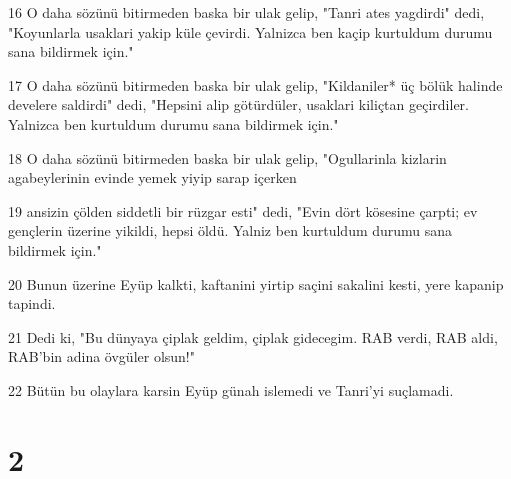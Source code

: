 \par 16 O daha sözünü bitirmeden baska bir ulak gelip, "Tanri ates yagdirdi" dedi, "Koyunlarla usaklari yakip küle çevirdi. Yalnizca ben kaçip kurtuldum durumu sana bildirmek için."
\par 17 O daha sözünü bitirmeden baska bir ulak gelip, "Kildaniler* üç bölük halinde develere saldirdi" dedi, "Hepsini alip götürdüler, usaklari kiliçtan geçirdiler. Yalnizca ben kurtuldum durumu sana bildirmek için."
\par 18 O daha sözünü bitirmeden baska bir ulak gelip, "Ogullarinla kizlarin agabeylerinin evinde yemek yiyip sarap içerken
\par 19 ansizin çölden siddetli bir rüzgar esti" dedi, "Evin dört kösesine çarpti; ev gençlerin üzerine yikildi, hepsi öldü. Yalniz ben kurtuldum durumu sana bildirmek için."
\par 20 Bunun üzerine Eyüp kalkti, kaftanini yirtip saçini sakalini kesti, yere kapanip tapindi.
\par 21 Dedi ki, "Bu dünyaya çiplak geldim, çiplak gidecegim. RAB verdi, RAB aldi, RAB'bin adina övgüler olsun!"
\par 22 Bütün bu olaylara karsin Eyüp günah islemedi ve Tanri'yi suçlamadi.

\chapter{2}

